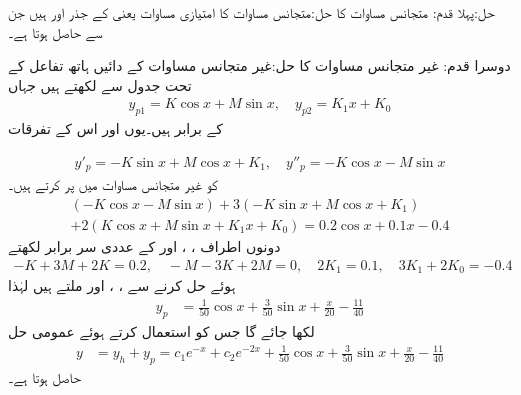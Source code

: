 حل:پہلا قدم: متجانس مساوات کا حل:\quad متجانس مساوات  کا امتیازی مساوات  یعنی   کے جذر  اور  ہیں جن سے   حاصل ہوتا ہے۔

دوسرا قدم: غیر متجانس مساوات کا حل:\quad غیر متجانس مساوات کے دائیں ہاتھ تفاعل کے تحت جدول  سے
   لکھتے ہیں جہاں 
\begin{align*}
y_{p1}=K\cos x+M\sin x, \quad y_{p2}=K_1x+K_0
\end{align*}
کے برابر ہیں۔یوں  اور اس کے تفرقات 

\begin{align*}
y'_p=-K\sin x+M\cos x+K_1, \quad y''_p=-K\cos x-M\sin x
\end{align*}
کو غیر متجانس مساوات میں پر کرتے ہیں۔
\begin{multline*}
(-K\cos x-M\sin x)+3(-K\sin x+M\cos x+K_1)\\
+2(K\cos x+M\sin x+K_1x+K_0)=0.2\cos x+0.1x-0.4
\end{multline*}
دونوں اطراف ، ،  اور  کے عددی سر برابر لکھتے
\begin{align*}
-K+3M+2K=0.2, \quad -M-3K+2M=0, \quad 2K_1=0.1, \quad 3K_1+2K_0=-0.4
\end{align*}
ہوئے حل کرنے سے ، ،  اور  ملتے ہیں لہٰذا 
\begin{align*}
y_p&=\tfrac{1}{50}\cos x+\tfrac{3}{50}\sin x+\tfrac{x}{20}-\frac{11}{40}
\end{align*}
لکھا جائے گا جس کو استعمال کرتے ہوئے عمومی حل
\begin{align*}
y&=y_h+y_p=c_1e^{-x}+c_2e^{-2x}+\tfrac{1}{50}\cos x+\tfrac{3}{50}\sin x+\tfrac{x}{20}-\frac{11}{40}
\end{align*}
حاصل ہوتا ہے۔

